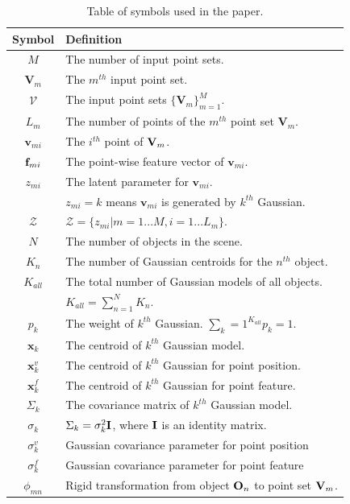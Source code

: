 \begin{table}[!hbp]
\centering
\caption{Table of symbols used in the paper.} 
\label{tab:symbol}
\begin{tabular}{c|l}
\hline
Symbol         & Definition\\
\hline
$M$            & The number of input point sets.\\
$\mathbf{V}_m$ & The $m^{th}$ input point set.\\
$\mathcal{V}$  & The input point sets $\{\mathbf{V}_m\}^{M}_{m=1}$.\\
$L_m$          & The number of points of the $m^{th}$ point set $\mathbf{V}_m$.\\
$\pmb{v}_{mi}$ & The $i^{th}$ point of $\mathbf{V}_m$.\\
$\mathbf{f}_{mi}$   & The point-wise feature vector of $\pmb v_{mi}$.\\
$z_{mi}$       & The latent parameter for $\pmb v_{mi}$.\\
               & $z_{mi}=k$ means $\pmb{v}_{mi}$ is generated by $k^{th}$ Gaussian. \\
$\mathcal{Z}$            & $\mathcal{Z}=\{z_{mi}|m=1...M,i=1...L_m\}$.\\
$N$            & The number of objects in the scene.\\
$K_n$          & The number of Gaussian centroids for the $n^{th}$ object. \\
$K_{all}$      & The total number of Gaussian models of all objects. \\
               & $K_{all} = \sum_{n=1}^N K_n $.\\
$p_k$          & The weight of $k^{th}$ Gaussian. $\sum_k=1^{K_{all}}p_k=1$.\\
$\pmb x_k$     & The centroid of $k^{th}$ Gaussian model.\\
$\pmb {x}^{v}_k$   & The centroid of $k^{th}$ Gaussian for point position.\\
$\pmb {x}^{f}_k$   & The centroid of $k^{th}$ Gaussian for point feature.\\
$\Sigma_k$     & The covariance matrix of $k^{th}$ Gaussian model.\\
$\sigma_k$     & $\Sigma_k=\sigma_k^2\mathbf{I}$, where $\mathbf{I}$ is an identity matrix.\\
$\sigma^v_k$   & Gaussian covariance parameter for point position\\
$\sigma^f_k$   & Gaussian covariance parameter for point feature\\
$\phi_{mn}$    & Rigid transformation from object $\mathbf{O}_n$ to point set $\mathbf{V}_m$.\\
\hline
\end{tabular}
\end{table}
